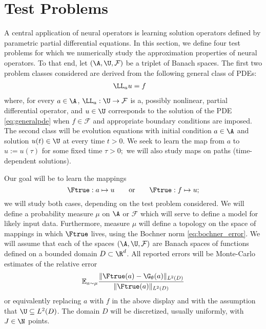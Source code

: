 
\section{Test Problems}
\label{sec:problems}


A central application of neural operators is learning solution operators defined by parametric partial differential equations. In this section, we define four test problems for which we numerically study the approximation properties of neural operators. To that end, let \((\A,\U,\mathcal{F})\) be a triplet of Banach spaces. The first two problem classes considered are derived from the following general class of PDEs: 
\begin{align}
\label{eq:generalpde}
\begin{split}
\LL_a u &= f
\end{split}
\end{align}
where, for every \(a \in \A\), \(\LL_a : \U \to \mathcal{F}\) is a, possibly nonlinear, partial differential operator, and \(u \in \U\) corresponds to the solution of the PDE \eqref{eq:generalpde} when \(f \in \mathcal{F}\) and appropriate boundary conditions are imposed.
The second class will be evolution equations with initial
condition \(a \in \A\) and solution \(u(t) \in \U\) at every time $t>0.$
We seek to learn the map from $a$ to $u:=u(\tau)$
for some fixed time $\tau>0;$ we will also study maps on 
paths (time-dependent solutions).

Our goal will be to learn the mappings
\[\Ftrue: a \mapsto u \qquad \text{or} \qquad \Ftrue : f \mapsto u;\]
we will study both cases, depending on the test problem considered. We will define a probability measure \(\mu\) on \(\A\) or \(\mathcal{F}\) which will serve to define a model for likely input data. Furthermore, measure \(\mu\) will define a topology on the space of mappings in which \(\Ftrue\) lives, using the Bochner norm \eqref{eq:bochner_error}. 
We will assume that each of the spaces \((\A,\U,\mathcal{F})\) are Banach spaces of functions defined on a bounded domain \(D \subset \R^d\). All reported errors will be Monte-Carlo estimates of the relative error
\[\mathbb{E}_{a \sim \mu} \frac{\|\Ftrue(a) - \G_\theta(a)\|_{L^2(D)}}{\|\Ftrue (a)\|_{L^2(D)}}\]
or equivalently replacing \(a\) with \(f\) in the above display and with the assumption that \(\U \subseteq L^2(D)\). The domain $D$ will be discretized,  usually uniformly, with $J \in \N$ points. 

